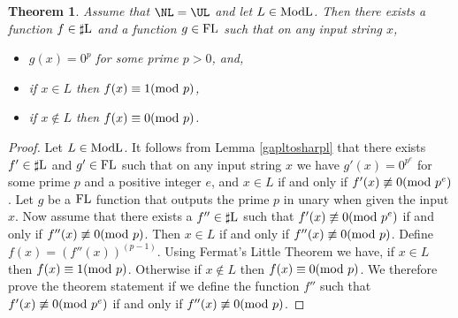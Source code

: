\documentclass{amsbook}
\newtheorem{theorem}{Theorem}[chapter]
\theoremstyle{definition}
\theoremstyle{remark}
\numberwithin{section}{chapter}
\numberwithin{equation}{chapter}
\newcommand{\sharpL}{\mbox{$\sharp$\rm L}}
\newcommand{\ModL}{\mbox{\rm ModL}}
\newcommand{\FL}{\mbox{\rm FL}}
\renewcommand{\mod}{\mbox{\textrm mod~}}
\begin{document}
\begin{theorem}\label{modlprime}
  Assume that $\NL =\UL$ and let $L\in \ModL$. Then there exists a
  function $f\in \sharpL$ and a function $g\in \FL$ such that on any
  input string $x$,
  \begin{itemize}
  \item $g(x)=0^p$ for some prime $p>0$, and,
  \item if $x\in L$ then $f(x)\equiv 1(\mod p)$,
  \item if $x\not\in L$ then $f(x)\equiv 0(\mod p)$.
  \end{itemize}
\end{theorem}

\begin{proof}
  Let $L\in \ModL$. It follows from Lemma \ref{gapltosharpl} that
  there exists $f'\in \sharpL$ and $g'\in \FL$ such that on any input
  string $x$ we have $g'(x)=0^{p^e}$ for some prime $p$ and a positive
  integer $e$, and $x\in L$ if and only if $f'(x)\not \equiv 0(\mod
  p^e)$. Let $g$ be a $\FL$ function that outputs the prime $p$ in unary when
  given the input $x$. Now assume that there exists a $f''\in \sharpL$
  such that $f'(x)\not \equiv 0(\mod p^e)$ if and only if $f''(x)\not
  \equiv 0(\mod p)$. Then $x\in L$ if and only if $f''(x)\not \equiv
  0(\mod p)$. Define $f(x)=(f''(x))^{(p-1)}$. Using Fermat's Little
  Theorem we have, if $x\in L$ then $f(x)\equiv 1(\mod
  p)$. Otherwise if $x\not \in L$ then $f(x)\equiv 0(\mod p)$. We
  therefore prove the theorem statement if we define the function
  $f''$ such that $f'(x)\not \equiv 0(\mod p^e)$ if and only if
  $f''(x)\not \equiv 0(\mod p)$.


\end{proof}
\end{document}
